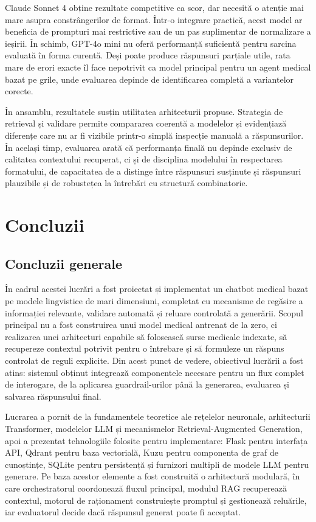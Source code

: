 \documentclass[12pt, a4paper, oneside, romanian]{teza-upb}
\begin{document}
Claude Sonnet 4 obține rezultate competitive ca scor, dar necesită o atenție mai mare asupra constrângerilor de format. Într-o integrare practică, acest model ar beneficia de prompturi mai restrictive sau de un pas suplimentar de normalizare a ieșirii. În schimb, GPT-4o mini nu oferă performanță suficientă pentru sarcina evaluată în forma curentă. Deși poate produce răspunsuri parțiale utile, rata mare de erori exacte îl face nepotrivit ca model principal pentru un agent medical bazat pe grile, unde evaluarea depinde de identificarea completă a variantelor corecte.

În ansamblu, rezultatele susțin utilitatea arhitecturii propuse. Strategia de retrieval și validare permite compararea coerentă a modelelor și evidențiază diferențe care nu ar fi vizibile printr-o simplă inspecție manuală a răspunsurilor. În același timp, evaluarea arată că performanța finală nu depinde exclusiv de calitatea contextului recuperat, ci și de disciplina modelului în respectarea formatului, de capacitatea de a distinge între răspunsuri susținute și răspunsuri plauzibile și de robustețea la întrebări cu structură combinatorie.
\chapter{Concluzii}
\section{Concluzii generale}

În cadrul acestei lucrări a fost proiectat și implementat un chatbot medical bazat pe modele lingvistice de mari dimensiuni, completat cu mecanisme de regăsire a informației relevante, validare automată și reluare controlată a generării. Scopul principal nu a fost construirea unui model medical antrenat de la zero, ci realizarea unei arhitecturi capabile să folosească surse medicale indexate, să recupereze contextul potrivit pentru o întrebare și să formuleze un răspuns controlat de reguli explicite. Din acest punct de vedere, obiectivul lucrării a fost atins: sistemul obținut integrează componentele necesare pentru un flux complet de interogare, de la aplicarea guardrail-urilor până la generarea, evaluarea și salvarea răspunsului final.

Lucrarea a pornit de la fundamentele teoretice ale rețelelor neuronale, arhitecturii Transformer, modelelor LLM și mecanismelor Retrieval-Augmented Generation, apoi a prezentat tehnologiile folosite pentru implementare: Flask pentru interfața API, Qdrant pentru baza vectorială, Kuzu pentru componenta de graf de cunoștințe, SQLite pentru persistență și furnizori multipli de modele LLM pentru generare. Pe baza acestor elemente a fost construită o arhitectură modulară, în care orchestratorul coordonează fluxul principal, modulul RAG recuperează contextul, motorul de raționament construiește promptul și gestionează reluările, iar evaluatorul decide dacă răspunsul generat poate fi acceptat.
\end{document}
